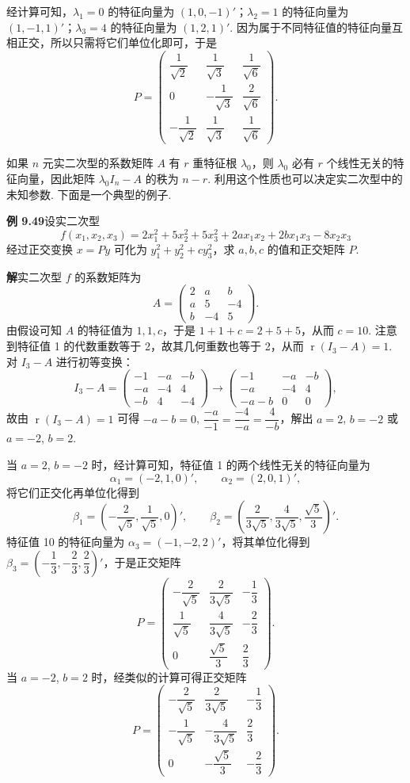 \documentclass[UTF8, 12pt, fontset=fandol, oneside]{ctexart}
\begin{document}
经计算可知，$\lambda_1=0$ 的特征向量为 $(1,0,-1)'$；$\lambda_2=1$ 的特征向量为 $(1,-1,1)'$；$\lambda_3=4$ 的特征向量为 $(1,2,1)'$. 因为属于不同特征值的特征向量互相正交，所以只需将它们单位化即可，于是
\[
P=\begin{pmatrix}
\dfrac1{\sqrt2}&\dfrac1{\sqrt3}&\dfrac1{\sqrt6}\\
0&-\dfrac1{\sqrt3}&\dfrac2{\sqrt6}\\
-\dfrac1{\sqrt2}&\dfrac1{\sqrt3}&\dfrac1{\sqrt6}
\end{pmatrix}.
\]

如果 $n$ 元实二次型的系数矩阵 $A$ 有 $r$ 重特征根 $\lambda_0$，则 $\lambda_0$ 必有 $r$ 个线性无关的特征向量，因此矩阵 $\lambda_0I_n-A$ 的秩为 $n-r$. 利用这个性质也可以决定实二次型中的未知参数. 下面是一个典型的例子.

\noindent\textbf{例 9.49}\quad 设实二次型
\[
f(x_1,x_2,x_3)=2x_1^2+5x_2^2+5x_3^2+2ax_1x_2+2bx_1x_3-8x_2x_3
\]
经过正交变换 $x=Py$ 可化为 $y_1^2+y_2^2+cy_3^2$，求 $a,b,c$ 的值和正交矩阵 $P$.

\noindent\textbf{解}\quad 实二次型 $f$ 的系数矩阵为
\[
A=\begin{pmatrix}
2&a&b\\
a&5&-4\\
b&-4&5
\end{pmatrix}.
\]
由假设可知 $A$ 的特征值为 $1,1,c$，于是 $1+1+c=2+5+5$，从而 $c=10$. 注意到特征值 1 的代数重数等于 2，故其几何重数也等于 2，从而 $\operatorname{r}(I_3-A)=1$. 对 $I_3-A$ 进行初等变换：
\[
I_3-A=
\begin{pmatrix}
-1&-a&-b\\
-a&-4&4\\
-b&4&-4
\end{pmatrix}
\longrightarrow
\begin{pmatrix}
-1&-a&-b\\
-a&-4&4\\
-a-b&0&0
\end{pmatrix},
\]
故由 $\operatorname{r}(I_3-A)=1$ 可得 $-a-b=0$, $\dfrac{-a}{-1}=\dfrac{-4}{-a}=\dfrac{4}{-b}$，解出 $a=2$, $b=-2$ 或 $a=-2$, $b=2$.

当 $a=2$, $b=-2$ 时，经计算可知，特征值 1 的两个线性无关的特征向量为
\[
\alpha_1=(-2,1,0)',\qquad \alpha_2=(2,0,1)',
\]
将它们正交化再单位化得到
\[
\beta_1=\left(-\frac2{\sqrt5},\frac1{\sqrt5},0\right)',\qquad
\beta_2=\left(\frac2{3\sqrt5},\frac4{3\sqrt5},\frac{\sqrt5}3\right)'.
\]
特征值 10 的特征向量为 $\alpha_3=(-1,-2,2)'$，将其单位化得到 $\beta_3=\left(-\dfrac13,-\dfrac23,\dfrac23\right)'$，于是正交矩阵
\[
P=\begin{pmatrix}
-\dfrac2{\sqrt5}&\dfrac2{3\sqrt5}&-\dfrac13\\
\dfrac1{\sqrt5}&\dfrac4{3\sqrt5}&-\dfrac23\\
0&\dfrac{\sqrt5}3&\dfrac23
\end{pmatrix}.
\]
当 $a=-2$, $b=2$ 时，经类似的计算可得正交矩阵
\[
P=\begin{pmatrix}
-\dfrac2{\sqrt5}&\dfrac2{3\sqrt5}&-\dfrac13\\
-\dfrac1{\sqrt5}&-\dfrac4{3\sqrt5}&\dfrac23\\
0&-\dfrac{\sqrt5}3&-\dfrac23
\end{pmatrix}.
\]
\end{document}
